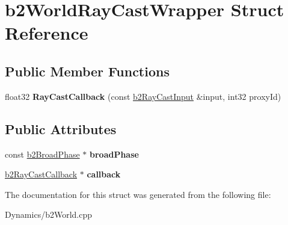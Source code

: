 \hypertarget{structb2WorldRayCastWrapper}{}\section{b2\+World\+Ray\+Cast\+Wrapper Struct Reference}
\label{structb2WorldRayCastWrapper}
\subsection*{Public Member Functions}
\begin{DoxyCompactItemize}
\item 
\mbox{\label{structb2WorldRayCastWrapper_a336aa5b664c3cfea61b0e28066f796d4}} 
float32 {\bfseries Ray\+Cast\+Callback} (const \mbox{\hyperlink{structb2RayCastInput}{b2\+Ray\+Cast\+Input}} \&input, int32 proxy\+Id)
\end{DoxyCompactItemize}
\subsection*{Public Attributes}
\begin{DoxyCompactItemize}
\item 
\mbox{\label{structb2WorldRayCastWrapper_a8bf380db0756a568bec076e549544145}} 
const \mbox{\hyperlink{classb2BroadPhase}{b2\+Broad\+Phase}} $\ast$ {\bfseries broad\+Phase}
\item 
\mbox{\label{structb2WorldRayCastWrapper_a5e6d85af5ae2cda7a8da2306d6b86a3e}} 
\mbox{\hyperlink{classb2RayCastCallback}{b2\+Ray\+Cast\+Callback}} $\ast$ {\bfseries callback}
\end{DoxyCompactItemize}


The documentation for this struct was generated from the following file\+:\begin{DoxyCompactItemize}
\item 
Dynamics/b2\+World.\+cpp\end{DoxyCompactItemize}
